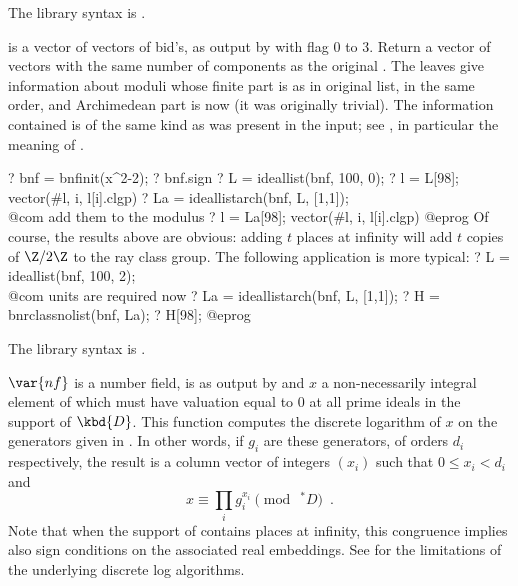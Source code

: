 The library syntax is .

\label{se:ideallistarch}
 is a vector of vectors of bid's, as output by  with
flag $0$ to $3$. Return a vector of vectors with the same number of
components as the original . The leaves give information about
moduli whose finite part is as in original list, in the same order, and
Archimedean part is now  (it was originally trivial). The
information contained is of the same kind as was present in the input; see
, in particular the meaning of \fl.

\bprog
? bnf = bnfinit(x^2-2);
? bnf.sign
? L = ideallist(bnf, 100, 0);
? l = L[98]; vector(#l, i, l[i].clgp)
? La = ideallistarch(bnf, L, [1,1]); \\@com add them to the modulus
? l = La[98]; vector(#l, i, l[i].clgp)
@eprog
Of course, the results above are obvious: adding $t$ places at infinity will
add $t$ copies of $\Z/2\Z$ to the ray class group. The following application
is more typical:
\bprog
? L = ideallist(bnf, 100, 2);        \\@com units are required now
? La = ideallistarch(bnf, L, [1,1]);
? H = bnrclassnolist(bnf, La);
? H[98];
@eprog

The library syntax is .

\label{se:ideallog}
$\var{nf}$ is a number field,
 is as output by  and $x$ a
non-necessarily integral element of  which must have valuation
equal to 0 at all prime ideals in the support of $\kbd{D}$. This function
computes the discrete logarithm of $x$ on the generators given in
. In other words, if $g_i$ are these generators, of orders
$d_i$ respectively, the result is a column vector of integers $(x_i)$ such
that $0\le x_i<d_i$ and
$$x \equiv \prod_i g_i^{x_i} \pmod{\ ^*D}\enspace.$$
Note that when the support of  contains places at infinity, this
congruence implies also sign conditions on the associated real embeddings.
See  for the limitations of the underlying discrete log algorithms.

